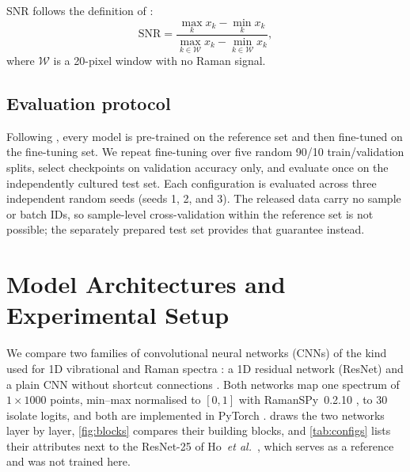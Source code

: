 \documentclass[journal,onecolumn]{IEEEtran}
\begin{document}
SNR follows the definition of \cite{ho2019rapid}:
\begin{equation}
  \mathrm{SNR} = \frac{\max_k x_k - \min_k x_k}
                      {\max_{k\in\mathcal{W}} x_k - \min_{k\in\mathcal{W}} x_k},
  \label{eq:snr}
\end{equation}
where $\mathcal{W}$ is a 20-pixel window with no Raman signal.

\subsection{Evaluation protocol}
Following \cite{ho2019rapid}, every model is pre-trained on the reference
set and then fine-tuned on the fine-tuning set. We repeat fine-tuning
over five random 90/10 train/validation splits, select checkpoints on
validation accuracy only, and evaluate once on the independently cultured
test set. Each configuration is evaluated across three independent random seeds
(seeds 1, 2, and 3). The released
data carry no sample or batch IDs, so sample-level cross-validation within
the reference set is not possible; the separately prepared test set
provides that guarantee instead.

\section{Model Architectures and Experimental Setup}
\label{sec:models}

We compare two families of convolutional neural networks (CNNs)
\cite{lecun1998gradient} of the kind used for 1D vibrational and Raman
spectra \cite{acquarelli2017convolutional,liu2017deep,deng2022scale}: a 1D
residual network (ResNet) \cite{he2016deep} and a plain CNN without
shortcut connections \cite{lecun1998gradient}. Both networks map one
spectrum of $1{\times}1000$ points, min--max normalised to $[0,1]$ with
RamanSPy~0.2.10 \cite{georgiev2024ramanspy}, to 30 isolate logits, and both
are implemented in PyTorch \cite{paszke2019pytorch}.  draws
the two networks layer by layer, \cref{fig:blocks} compares their building
blocks, and \cref{tab:configs} lists their attributes next to the ResNet-25
of Ho~\textit{et al.}\ \cite{ho2019rapid,ho2019bacteriaid}, which serves as a
reference and was not trained here.
\end{document}
